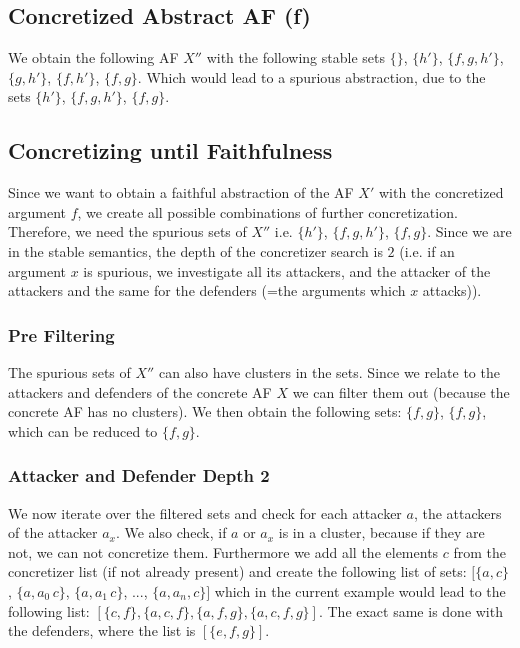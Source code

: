 \subsection{Concretized Abstract AF (f)}
We obtain the following AF $X''$ with the following stable sets $\{\}$, $\{h'\}$, $\{f, g, h'\}$, $\{g, h'\}$, $\{f, h'\}$, $\{f, g\}$.
Which would lead to a spurious abstraction, due to the sets $\{h'\}$, $\{f, g, h'\}$, $\{f, g\}$.
\begin{center}
\end{center}

\subsection{Concretizing until Faithfulness}
Since we want to obtain a faithful abstraction of the AF $X'$ with the concretized argument $f$, we create all possible combinations of further concretization.
Therefore, we need the spurious sets of $X''$ i.e. $\{h'\}$, $\{f, g, h'\}$, $\{f, g\}$. Since we are in the stable semantics, the depth of the concretizer search
is $2$ (i.e. if an argument $x$ is spurious, we investigate all its attackers, and the attacker of the attackers and the same for the defenders (=the arguments which $x$ attacks)).
\subsubsection{Pre Filtering}
The spurious sets of $X''$ can also have clusters in the sets. Since we relate to the attackers and defenders of the concrete AF $X$ we can filter them out (because the concrete
AF has no clusters). We then obtain the following sets: $\{f, g\}$, $\{f, g\}$, which can be reduced to $\{f, g\}$.
\subsubsection{Attacker and Defender Depth 2}
We now iterate over the filtered sets and check for each attacker $a$, the attackers of the attacker $a_x$. We also check, if $a$ or $a_x$ is in a cluster, because if they are not, we can not concretize them.
Furthermore we add all the elements $c$ from the concretizer list (if not already present) and create the following list of sets: $[\{a, c\}$, $\{a, a_0\, c\}$,  $\{a, a_1\, c\}$, $...$,  $\{a, a_n, c\}]$
which in the current example would lead to the following list: $[\{c, f\}, \{a, c, f\}, \{a, f, g\}, \{a, c, f, g\}]$.
The exact same is done with the defenders, where the list is $[\{e, f, g\}]$.
